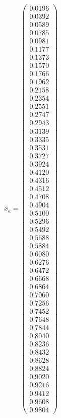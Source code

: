 \documentclass{udpreport}
\begin{document}
\begin{enumerate}
\begin{enumerate}
{{{{\begin{itemize}
				$x_{a} = \left(\begin{array}{c} 0.0196\\ 0.0392\\ 0.0589\\ 0.0785\\ 0.0981\\ 0.1177\\ 0.1373\\ 0.1570\\ 0.1766\\ 0.1962\\ 0.2158\\ 0.2354\\ 0.2551\\ 0.2747\\ 0.2943\\ 0.3139\\ 0.3335\\ 0.3531\\ 0.3727\\ 0.3924\\ 0.4120\\ 0.4316\\ 0.4512\\ 0.4708\\ 0.4904\\ 0.5100\\ 0.5296\\ 0.5492\\ 0.5688\\ 0.5884\\ 0.6080\\ 0.6276\\ 0.6472\\ 0.6668\\ 0.6864\\ 0.7060\\ 0.7256\\ 0.7452\\ 0.7648\\ 0.7844\\ 0.8040\\ 0.8236\\ 0.8432\\ 0.8628\\ 0.8824\\ 0.9020\\ 0.9216\\ 0.9412\\ 0.9608\\ 0.9804 \end{array}\right)$
				

\end{itemize}}}}}
\end{enumerate}
\end{enumerate}
\end{document}
